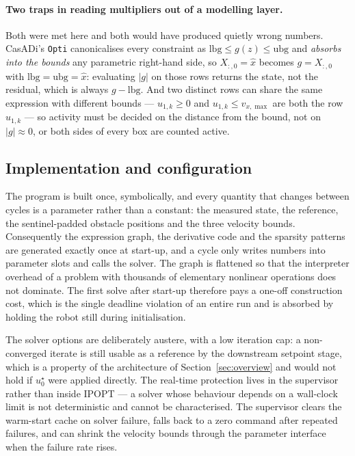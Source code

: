 \documentclass[11pt,a4paper]{article}
\begin{document}
\paragraph{Two traps in reading multipliers out of a modelling layer.} Both were met here and both would have
produced quietly wrong numbers. CasADi's \texttt{Opti} canonicalises every constraint as
$\mathrm{lbg}\le g(z)\le\mathrm{ubg}$ and \emph{absorbs into the bounds} any parametric right-hand side, so
$X_{:,0}=\hat x$ becomes $g=X_{:,0}$ with $\mathrm{lbg}=\mathrm{ubg}=\hat x$: evaluating $|g|$ on those rows
returns the state, not the residual, which is always $g-\mathrm{lbg}$. And two distinct rows can share the
same expression with different bounds --- $u_{1,k}\ge0$ and $u_{1,k}\le v_{x,\max}$ are both the row
$u_{1,k}$ --- so activity must be decided on the distance from the bound, not on $|g|\approx0$, or both sides
of every box are counted active.

\subsection{Implementation and configuration}
\label{sec:impl}

The program is built once, symbolically, and every quantity that changes between cycles is a parameter rather
than a constant: the measured state, the reference, the sentinel-padded obstacle positions and the three
velocity bounds. Consequently the expression graph, the derivative code and the sparsity patterns are
generated exactly once at start-up, and a cycle only writes numbers into parameter slots and calls the
solver. The graph is flattened so that the interpreter overhead of a problem with thousands of elementary
nonlinear operations does not dominate. The first solve after start-up therefore pays a one-off construction
cost, which is the single deadline violation of an entire run and is absorbed by holding the robot still
during initialisation.

The solver options are deliberately austere, with a low iteration cap: a non-converged iterate is still
usable as a reference by the downstream setpoint stage, which is a property of the architecture of
Section~\ref{sec:overview} and would not hold if $u^\star_0$ were applied directly. The real-time protection
lives in the supervisor rather than inside IPOPT --- a solver whose behaviour depends on a wall-clock limit
is not deterministic and cannot be characterised. The supervisor clears the warm-start cache on solver
failure, falls back to a zero command after repeated failures, and can shrink the velocity bounds through the
parameter interface when the failure rate rises.
\end{document}
